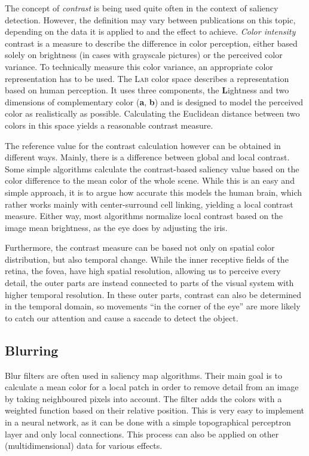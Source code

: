 \documentclass[a4paper,12pt,fleqn,oneside]{scrartcl}
\begin{document}
The concept of \textit{contrast} is being used quite often in the context of saliency detection. However, the definition
may vary between publications on this topic, depending on the data it is applied to and the effect to achieve.
\emph{Color intensity} contrast is a measure to describe the difference in color perception, either based solely on brightness (in
cases with grayscale pictures) or the perceived color variance.  To technically measure this color variance, an
appropriate color representation has to be used. The \textsc{Lab} color space describes a representation based on human
perception. It uses three components, the \textbf{L}ightness and two dimensions of  complementary color (\textbf{a},
\textbf{b}) and is designed to model the perceived color as realistically as possible. Calculating the Euclidean
distance between two colors in this space yields a reasonable contrast measure.

The reference value for the contrast calculation however can be obtained in different ways. Mainly, there is a
difference between global and local contrast. Some simple algorithms calculate the contrast-based saliency value based
on the color difference to the mean color of the whole scene. While this is an easy and simple approach, it is to argue
how accurate this models the human brain, which rather works mainly with center-surround cell linking, yielding a local
contrast measure. Either way, most algorithms normalize local contrast based on the image mean brightness, as the eye
does by adjusting the iris.

Furthermore, the contrast measure can be based not only on spatial color distribution, but also temporal change. While
the inner receptive fields of the retina, the fovea, have high spatial resolution, allowing us to perceive every detail,
the outer parts are instead connected to parts of the visual system with higher temporal resolution. In
these outer parts, contrast can also be determined in the temporal domain, so movements ``in the corner of the eye'' are
more likely to catch our attention and cause a saccade to detect the object.

\subsection{Blurring}

Blur filters are often used in saliency map algorithms. Their main goal is to calculate a mean color for a local patch
in order to remove detail from an image  by taking neighboured pixels into account. The filter adds the colors with a
weighted function based on their relative position. This is very easy to implement in a neural network, as it can be
done with a simple topographical perceptron  layer and only local connections.  This process can also be applied on
other (multidimensional) data for various effects.
\end{document}

